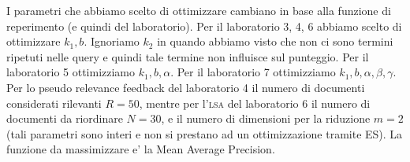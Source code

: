 I parametri che abbiamo scelto di ottimizzare cambiano in base alla funzione di reperimento (e quindi del laboratorio). Per il laboratorio 3, 4, 6 abbiamo scelto di ottimizzare $k_1, b$. Ignoriamo $k_2$ in quando abbiamo visto che non ci sono termini ripetuti nelle query e quindi tale termine non influisce sul punteggio. Per il laboratorio 5 ottimizziamo $k_1, b, \alpha$. Per il laboratorio 7 ottimizziamo $k_1, b, \alpha, \beta, \gamma$. Per lo pseudo relevance feedback del laboratorio 4 il numero di documenti considerati rilevanti $R = 50$, mentre per l'\textsc{lsa} del laboratorio 6 il numero di documenti da riordinare $N = 30$, e il numero di dimensioni per la riduzione $m=2$ (tali parametri sono interi e non si prestano ad un ottimizzazione tramite ES). La funzione da massimizzare e' la Mean Average Precision.

